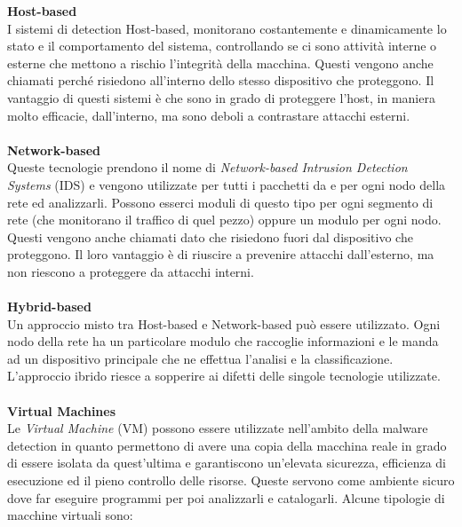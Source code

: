 \textbf{Host-based}\\
I sistemi di detection Host-based, monitorano costantemente e dinamicamente lo stato e il comportamento del sistema, controllando se ci sono attività interne o esterne che mettono a rischio l'integrità della macchina. Questi vengono anche chiamati  perché risiedono all'interno dello stesso dispositivo che proteggono.
Il vantaggio di questi sistemi è che sono in grado di proteggere l'host, in maniera molto efficacie, dall'interno, ma sono deboli a contrastare attacchi esterni.\\
\\
\textbf{Network-based}\\
Queste tecnologie prendono il nome di \textit{Network-based Intrusion Detection Systems} (IDS) e vengono utilizzate per  tutti i pacchetti da e per ogni nodo della rete ed analizzarli. Possono esserci moduli di questo tipo per ogni segmento di rete (che monitorano il traffico di quel pezzo) oppure un modulo per ogni nodo. Questi vengono anche chiamati  dato che risiedono fuori dal dispositivo che proteggono. Il loro vantaggio è di riuscire a prevenire attacchi dall'esterno, ma non riescono a proteggere da attacchi interni.\\
\\
\textbf{Hybrid-based}\\
Un approccio misto tra Host-based e Network-based può essere utilizzato. Ogni nodo della rete ha un particolare modulo che raccoglie informazioni e le manda ad un dispositivo principale che ne effettua l'analisi e la classificazione. L'approccio ibrido riesce a sopperire ai difetti delle singole tecnologie utilizzate.\\
\\
\textbf{Virtual Machines}\\
Le \textit{Virtual Machine} (VM) possono essere utilizzate nell'ambito della malware detection in quanto permettono di avere una copia della macchina reale in grado di essere isolata da quest'ultima e garantiscono un'elevata sicurezza, efficienza di esecuzione ed il pieno controllo delle risorse. Queste servono come ambiente sicuro dove far eseguire programmi per poi analizzarli e catalogarli. Alcune tipologie di macchine virtuali sono:


